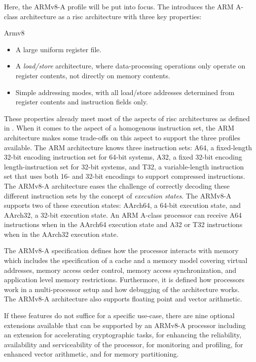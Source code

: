 Here, the ARMv8-A profile will be put into focus.
The  \cite{Armv8} introduces the ARM A-class architecture as a \gls{risc} architecture with three key properties:
\begin{displaycquote}[p.A1-34]{Armv8}
    \begin{itemize}
        \item A large uniform register file.
        \item A \textit{load/store} architecture, where data-processing operations only operate on register contents, not directly on memory contents.
        \item Simple addressing modes, with all load/store addresses determined from register contents and instruction fields only.
    \end{itemize}
\end{displaycquote}

These properties already meet most of the aspects of \gls{risc} architectures as defined in \cite{Hennessy12}.
When it comes to the aspect of a homogenous instruction set, the ARM architecture makes some trade-offs on this aspect to support the three profiles available.
The ARM architecture knows three instruction sets: A64, a fixed-length 32-bit encoding instruction set for 64-bit systems, A32, a fixed 32-bit encoding length-instruction set for 32-bit systems, and T32, a variable-length instruction set that uses both 16- and 32-bit encodings to support compressed instructions.
The ARMv8-A architecture eases the challenge of correctly decoding these different instruction sets by the concept of \textit{execution states}.
The ARMv8-A supports two of these execution states: AArch64, a 64-bit execution state, and AArch32, a 32-bit execution state.
An ARM A-class processor can receive A64 instructions when in the AArch64 execution state and A32 or T32 instructions when in the AArch32 execution state.

The ARMv8-A specification defines how the processor interacts with memory which includes the specification of a cache and a memory model covering virtual addresses, memory access order control, memory access synchronization, and application level memory restrictions.
Furthermore, it is defined how processors work in a multi-processor setup and how debugging of the architecture works.
The ARMv8-A architecture also supports floating point and vector arithmetic.

If these features do not suffice for a specific use-case, there are nine optional extensions available that can be supported by an ARMv8-A processor including an extension for accelerating cryptographic tasks, for enhancing the reliability, availability and serviceability of the processor, for monitoring and profiling, for enhanced vector arithmetic, and for memory partitioning.

